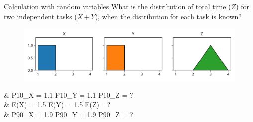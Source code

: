 \documentclass[12pt, aspectratio=149]{beamer}
\theoremstyle{plain}
\begin{document}
\begin{frame}[fragile]{Calculation with random variables}
	What is the distribution of total time ($Z$) for two independent tasks ($X + Y$), when the distribution for each task is known?
    \begin{center}
     \begin{figure}
     	\centering
     	\includegraphics[width=0.99\linewidth]{figures/add_uniform}
     \end{figure}
     \end{center}
	 \begin{flalign*}
     &\hspace*{1em} P10_X = 1.1 \hspace*{4em} P10_Y = 1.1 \hspace*{4em}  P10_Z = ? \\
	 &\hspace*{1em} E(X) = 1.5  \hspace*{4.2em} E(Y) = 1.5  \hspace*{4.3em}  E(Z)= ? \\
     &\hspace*{1em} P90_X = 1.9 \hspace*{4em} P90_Y = 1.9 \hspace*{4em}  P90_Z = ? \\
	\end{flalign*}
\end{frame}
\end{document}
